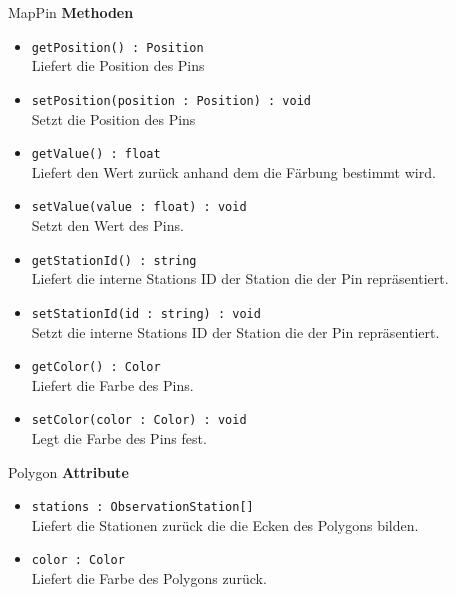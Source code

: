     \begin{Class}{MapPin}
        \textbf{Methoden}
        \begin{itemize}
            \item \texttt{getPosition() : Position}
            \\ Liefert die Position des Pins
            \item \texttt{setPosition(position : Position) : void}
            \\ Setzt die Position des Pins

            \bigskip
            \item \texttt{getValue() : float}
            \\ Liefert den Wert zurück anhand dem die Färbung bestimmt wird.
            \item \texttt{setValue(value : float) : void}
            \\ Setzt den Wert des Pins.

            \bigskip
            \item \texttt{getStationId() : string}
            \\ Liefert die interne Stations ID der Station die der Pin repräsentiert.
            \item \texttt{setStationId(id : string) : void}
            \\ Setzt die interne Stations ID der Station die der Pin repräsentiert.

            \bigskip
            \item \texttt{getColor() : Color}
            \\ Liefert die Farbe des Pins.
            \item \texttt{setColor(color : Color) : void}
            \\ Legt die Farbe des Pins fest.
        \end{itemize}
    \end{Class}

    \begin{Class}{Polygon}
        \textbf{Attribute}
        \begin{itemize}
            \item \texttt{stations : ObservationStation[]}
            \\ Liefert die Stationen zurück die die Ecken des Polygons bilden.
            \item \texttt{color : Color}
            \\ Liefert die Farbe des Polygons zurück.
        \end{itemize}
    \end{Class}

